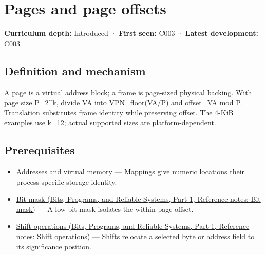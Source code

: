 \hypertarget{appendix-0c67cd5bf30a}{}\label{referencestart:appendix-0c67cd5bf30a}
\section{Pages and page offsets}\label{appendix-0c67cd5bf30a-pages-and-page-offsets}

\hypertarget{appendix-0c67cd5bf30a-pages-and-page-offsets}{}

\textbf{Curriculum depth:} Introduced · \textbf{First seen:} C003 · \textbf{Latest development:} C003

\begin{allmightroledefinition}

\subsection{Definition and mechanism}\label{appendix-0c67cd5bf30a-definition-and-mechanism}

\hypertarget{appendix-0c67cd5bf30a-definition-and-mechanism}{}

A page is a virtual address block; a frame is page-sized physical backing. With page size P=2\^{}k, divide VA into VPN=floor(VA/P) and offset=VA mod P. Translation substitutes frame identity while preserving offset. The 4-KiB examples use k=12; actual supported sizes are platform-dependent.

\end{allmightroledefinition}

\subsection{Prerequisites}\label{appendix-0c67cd5bf30a-prerequisites}

\hypertarget{appendix-0c67cd5bf30a-prerequisites}{}

\begin{itemize}
\tightlist
\item
  \hyperref[appendix-18ee4f913c3c]{Addresses and virtual memory} --- Mappings give numeric locations their process-specific storage identity.
\item
  \href{../01-Bits-Programs-and-Reliable-Systems-P01/main.pdf\#nameddest=appendix-dbe5905163c2}{Bit mask (Bits, Programs, and Reliable Systems, Part 1, Reference notes: Bit mask)} --- A low-bit mask isolates the within-page offset.
\item
  \href{../01-Bits-Programs-and-Reliable-Systems-P01/main.pdf\#nameddest=appendix-73425b25118e}{Shift operations (Bits, Programs, and Reliable Systems, Part 1, Reference notes: Shift operations)} --- Shifts relocate a selected byte or address field to its significance position.
\end{itemize}

